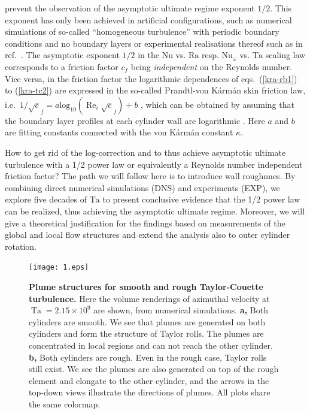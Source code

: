 \documentclass[aps,prl,superscriptaddress,preprint]{revtex4}
\renewcommand{\Re}{\operatorname{Re}}
\newcommand{\Ta}{\operatorname{Ta}}
\begin{document}
prevent the observation of the asymptotic ultimate regime exponent $1/2$. This exponent has only been achieved in 
artificial configurations, such as numerical simulations of so-called ``homogeneous  turbulence'' \cite{loh03} with periodic
boundary conditions and no boundary layers or experimental realisations thereof such as in ref.\ \cite{gib06,cho09}. The asymptotic exponent $1/2$ in the $\mathrm{Nu}$ vs. $\mathrm{Ra}$ resp. $\mathrm{Nu}_\omega$ vs. $\mathrm{Ta}$ scaling law corresponds to a friction factor $c_f$ being {\it independent} on the Reynolds number. Vice versa, in the friction factor the logarithmic dependences of eqs.\ (\ref{kra-rb1}) to (\ref{kra-tc2}) are expressed in the so-called Prandtl-von K\'arm\'an skin friction law, i.e.\ $1/\sqrt c_f = a \mathrm{log}_{10} (\Re_i \sqrt c_f) + b$ \cite{kar21,sch00,pop00}, which can be obtained by assuming that the boundary layer 
  profiles at each cylinder wall are 
  logarithmic  \cite{hui13,ost14pof}. Here $a$ and $b$ are fitting constants
  connected with the von K\'arm\'an constant $\kappa$. 
 
 
 
 How to get rid of the log-correction and to thus achieve asymptotic ultimate turbulence with a 1/2 power law 
 or equivalently a Reynolds number independent friction factor? The path we will follow here is to introduce wall roughnnes. By combining direct numerical simulations (DNS) and experiments (EXP), we explore five decades of $\mathrm{Ta}$ to present conclusive evidence that the 1/2 power law can be realized, thus achieving the asymptotic ultimate regime. Moreover, we will give a theoretical justification for the
 findings based on measurements of the global and local flow structures and extend the analysis also to outer cylinder rotation. 
 
 
  \begin{figure}[!h]
\begin{center}
\texttt{[image: 1.eps]}
\caption{
{\bf Plume structures for smooth and rough Taylor-Couette turbulence.} Here the volume renderings of azimuthal velocity at $\Ta=2.15\times10^9$ are shown, from numerical simulations. {\bf a,} Both cylinders are smooth. We see that plumes are generated on both cylinders and form the structure of Taylor rolls. The plumes are concentrated in local regions and can not reach the other cylinder. {\bf b,} Both cylinders are rough. Even in the rough case, Taylor rolls still exist. We see the plumes are also generated on top of the rough element and elongate to the other cylinder, and the arrows in the top-down views illustrate the directions of plumes. All plots share the same colormap.}
\label{fig:fig1}
\end{center}
\end{figure}
\end{document}
